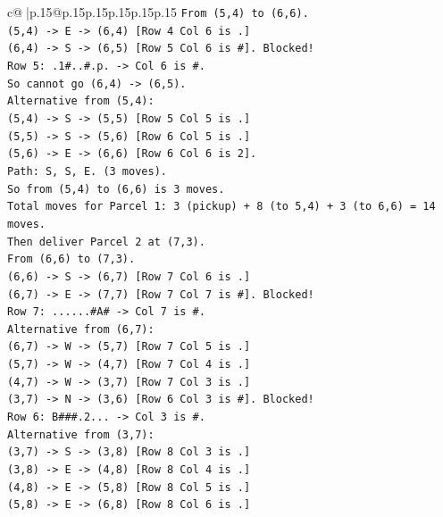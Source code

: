 \documentclass{article}
\begin{document}
{\begin{supertabular}{c@{$\;$}|p{.15\linewidth}@{}p{.15\linewidth}p{.15\linewidth}p{.15\linewidth}p{.15\linewidth}p{.15\linewidth}}
{{{\texttt{From (5,4) to (6,6).} \\
\texttt{(5,4) {-}> E {-}> (6,4) {[}Row 4 Col 6 is .{]}} \\
\texttt{(6,4) {-}> S {-}> (6,5) {[}Row 5 Col 6 is \#{]}. Blocked!} \\
\texttt{Row 5: .1\#..\#.p. {-}> Col 6 is \#.} \\
\texttt{So cannot go (6,4) {-}> (6,5).} \\
\texttt{Alternative from (5,4):} \\
\texttt{(5,4) {-}> S {-}> (5,5) {[}Row 5 Col 5 is .{]}} \\
\texttt{(5,5) {-}> S {-}> (5,6) {[}Row 6 Col 5 is .{]}} \\
\texttt{(5,6) {-}> E {-}> (6,6) {[}Row 6 Col 6 is 2{]}.} \\
\texttt{Path: S, S, E. (3 moves).} \\
\texttt{So from (5,4) to (6,6) is 3 moves.} \\
\texttt{Total moves for Parcel 1: 3 (pickup) + 8 (to 5,4) + 3 (to 6,6) = 14 moves.} \\
\texttt{Then deliver Parcel 2 at (7,3).} \\
\texttt{From (6,6) to (7,3).} \\
\texttt{(6,6) {-}> S {-}> (6,7) {[}Row 7 Col 6 is .{]}} \\
\texttt{(6,7) {-}> E {-}> (7,7) {[}Row 7 Col 7 is \#{]}. Blocked!} \\
\texttt{Row 7: ......\#A\# {-}> Col 7 is \#.} \\
\texttt{Alternative from (6,7):} \\
\texttt{(6,7) {-}> W {-}> (5,7) {[}Row 7 Col 5 is .{]}} \\
\texttt{(5,7) {-}> W {-}> (4,7) {[}Row 7 Col 4 is .{]}} \\
\texttt{(4,7) {-}> W {-}> (3,7) {[}Row 7 Col 3 is .{]}} \\
\texttt{(3,7) {-}> N {-}> (3,6) {[}Row 6 Col 3 is \#{]}. Blocked!} \\
\texttt{Row 6: B\#\#\#.2... {-}> Col 3 is \#.} \\
\texttt{Alternative from (3,7):} \\
\texttt{(3,7) {-}> S {-}> (3,8) {[}Row 8 Col 3 is .{]}} \\
\texttt{(3,8) {-}> E {-}> (4,8) {[}Row 8 Col 4 is .{]}} \\
\texttt{(4,8) {-}> E {-}> (5,8) {[}Row 8 Col 5 is .{]}} \\
\texttt{(5,8) {-}> E {-}> (6,8) {[}Row 8 Col 6 is .{]}} \\
}}}
\end{supertabular}}
\end{document}
